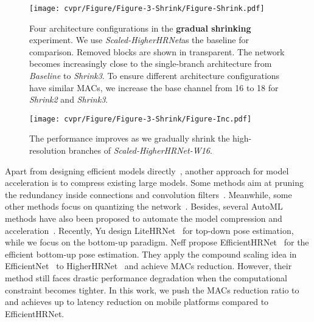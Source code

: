 \documentclass[10pt,twocolumn,letterpaper]{article}
\begin{document}
\begin{figure*}
\centering
	\texttt{[image: cvpr/Figure/Figure-3-Shrink/Figure-Shrink.pdf]}
\caption{Four architecture configurations in the \textbf{gradual shrinking} experiment. We use \textit{Scaled-HigherHRNet}\protect\footnotemark as the baseline for comparison. Removed blocks are shown in transparent. The network becomes increasingly close to the single-branch architecture from \textit{Baseline} to \textit{Shrink3}. To ensure different architecture configurations have similar MACs, we increase the base channel from 16 to 18 for \textit{Shrink2} and \textit{Shrink3}.}
\label{fig:3-shrink}
\end{figure*}



 \begin{figure}
\centering
	\texttt{[image: cvpr/Figure/Figure-3-Shrink/Figure-Inc.pdf]}
\caption{The performance improves as we gradually shrink the high-resolution branches of \textit{Scaled-HigherHRNet-W16}.}
\label{fig:3-increase}
\end{figure}
 
 Apart from designing efficient models directly~\cite{howard2017mobilenets,sandler2018mobilenetv2,ma2018shufflenet,zhang2018shufflenet,liu2019point,wu2020lite}, another approach for model acceleration is to compress existing large models. Some methods aim at pruning the redundancy inside connections and convolution filters~\cite{han2015deep,han2015learning,wen2016learning,he2017channel,lin2017runtime,liu2017learning}. Meanwhile, some other methods focus on quantizing the network~\cite{courbariaux2016binarized,zhu2016trained,krishnamoorthi2018quantizing,wang2019haq}. Besides, several AutoML methods have also been proposed to automate the model compression and acceleration~\cite{he2018amc,yang2018netadapt,wang2019haq,liu2019metapruning}.
Recently, Yu \etal design LiteHRNet~\cite{yu2021lite} for top-down pose estimation, while we focus on the bottom-up paradigm. Neff \etal propose EfficientHRNet~\cite{neff2020efficienthrnet} for the efficient bottom-up pose estimation. They apply the compound scaling idea in EfficientNet~\cite{tan2019efficientnet} to HigherHRNet~\cite{cheng2020higherhrnet} and achieve  MACs reduction. However, their method still faces drastic performance degradation when the computational constraint becomes tighter. In this work, we push the MACs reduction ratio to  and achieves up to  latency reduction on mobile platforms compared to EfficientHRNet. 
\end{document}
